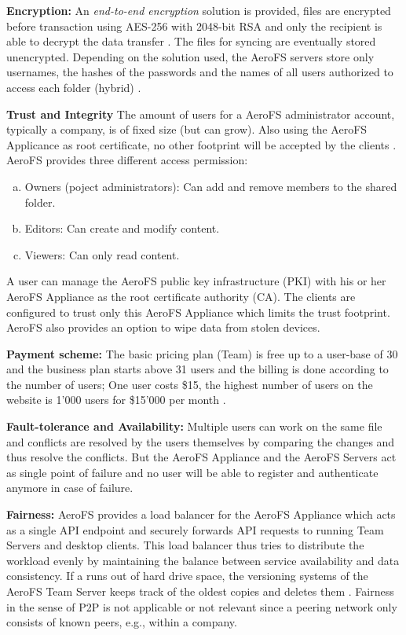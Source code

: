\textbf{Encryption:} An \textit{end-to-end encryption} solution is provided, files are encrypted before transaction using AES-256 with 2048-bit RSA and only the recipient is able to decrypt the data transfer \cite{aerofs:security}. The files for syncing are eventually stored unencrypted. Depending on the solution used, the AeroFS servers store only usernames, the hashes of the passwords and the names of all users authorized to access each folder (hybrid) \cite{aerofs:security_2}.

\textbf{Trust and Integrity} The amount of users for a AeroFS administrator account, typically a company, is of fixed size (but can grow). Also using the AeroFS Applicance as root certificate, no other footprint will be accepted by the clients \cite{aerofs:security}. AeroFS provides three different access permission:
\begin{enumerate}[(a)]
\item Owners (poject administrators): Can add and remove members to the shared folder.
\item Editors: Can create and modify content.
\item Viewers: Can only read content.
\end{enumerate}
A user can manage the AeroFS public key infrastructure (PKI) with his or her AeroFS Appliance as the root certificate authority (CA). The clients are configured to trust only this AeroFS Appliance which limits the trust footprint. AeroFS also provides an option to wipe data from stolen devices.

\textbf{Payment scheme:} The basic pricing plan (Team) is free up to a user-base of 30 \cite{aerofs:blog:30_users_free} and the business plan starts above 31 users and the billing is done according to the number of users; One user costs \$15, the highest number of users on the website is 1'000 users for \$15'000 per month \cite{aerofs:pricing}.

\textbf{Fault-tolerance and Availability:} Multiple users can work on the same file and conflicts are resolved by the users themselves by comparing the changes and thus resolve the conflicts. But the AeroFS Appliance and the AeroFS Servers act as single point of failure and no user will be able to register and authenticate anymore in case of failure.

\textbf{Fairness:} AeroFS provides a load balancer for the AeroFS Appliance which acts as a single API endpoint and securely forwards API requests to running Team Servers and desktop clients. This load balancer thus tries to distribute the workload evenly by maintaining the balance between service availability and data consistency. If a runs out of hard drive space, the versioning systems of the AeroFS Team Server keeps track of the oldest copies and deletes them \cite{aerofs:USTO.RE}. Fairness in the sense of P2P is not applicable or not relevant since a peering network only consists of known peers, e.g., within a company.

